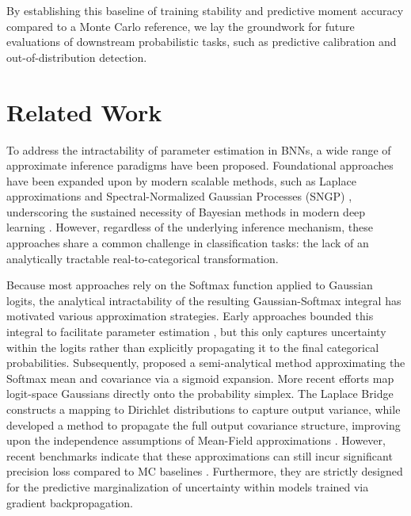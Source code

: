 \documentclass{uai2026} %
\begin{document}
By establishing this baseline of training stability and predictive moment accuracy compared to a Monte Carlo reference, we lay the groundwork for future evaluations of downstream probabilistic tasks, such as predictive calibration and out-of-distribution detection.

\section{Related Work}
\vspace{-1em}
To address the intractability of parameter estimation in BNNs, a wide range of approximate inference paradigms have been proposed. Foundational approaches \citep{neal1993probabilistic, mackay1992practical, Wainwright2008GraphicalME, lakshminarayanan2017simple} have been expanded upon by modern scalable methods, such as Laplace approximations \citep{daxberger2021laplace} and Spectral-Normalized Gaussian Processes (SNGP) \citep{liu2020simple}, underscoring the sustained necessity of Bayesian methods in modern deep learning \citep{pmlr-v235-papamarkou24b}. However, regardless of the underlying inference mechanism, these approaches share a common challenge in classification tasks: the lack of an analytically tractable real-to-categorical transformation.

Because most approaches rely on the Softmax function applied to Gaussian logits, the analytical intractability of the resulting Gaussian-Softmax integral has motivated various approximation strategies. Early approaches bounded this integral to facilitate parameter estimation \citep{bouchard_efficient_2007}, but this only captures uncertainty within the logits rather than explicitly propagating it to the final categorical probabilities. Subsequently, \cite{daunizeau2017semi} proposed a semi-analytical method approximating the Softmax mean and covariance via a sigmoid expansion. More recent efforts map logit-space Gaussians directly onto the probability simplex. The Laplace Bridge \citep{hobbhahn2022fast} constructs a mapping to Dirichlet distributions to capture output variance, while \cite{shekhovtsov2018feed} developed a method to propagate the full output covariance structure, improving upon the independence assumptions of Mean-Field approximations \citep{lu_mean-field_2021}. However, recent benchmarks indicate that these approximations can still incur significant precision loss compared to MC baselines \citep{Mucsanyietal2025}. Furthermore, they are strictly designed for the predictive marginalization of uncertainty within models trained via gradient backpropagation.
\end{document}
